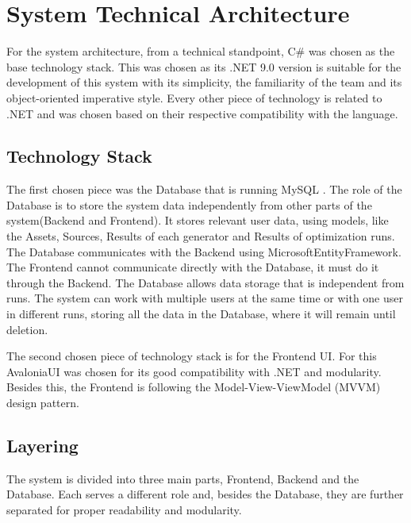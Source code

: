 \section{System Technical Architecture}

\hspace*{1cm}For the system architecture, from a technical standpoint, C\# \cite{csharp} was chosen as the base technology stack. This was chosen as its .NET 9.0 version is suitable for the development of this system with its simplicity, the familiarity of the team and its object-oriented imperative style. Every other piece of technology is related to .NET and was chosen based on their respective compatibility with the language.

\subsection*{Technology Stack}

\hspace*{1cm}The first chosen piece was the Database that is running MySQL \cite{dubois2013mysql}. The role of the Database is to store the system data independently from other parts of the system(Backend and Frontend). It stores relevant user data, using models, like the Assets, Sources, Results of each generator and Results of optimization runs. The Database communicates with the Backend using MicrosoftEntityFramework. The Frontend cannot communicate directly with the Database, it must do it through the Backend. The Database allows data storage that is independent from runs. The system can work with multiple users at the same time or with one user in different runs, storing all the data in the Database, where it will remain until deletion.
 
\hspace*{1cm}The second chosen piece of technology stack is for the Frontend UI. For this AvaloniaUI was chosen for its good compatibility with .NET and modularity. Besides this, the Frontend is following the Model-View-ViewModel (MVVM) design pattern.

\subsection*{Layering}

\hspace*{1cm}The system is divided into three main parts, Frontend, Backend and the Database. Each serves a different role and, besides the Database, they are further separated for proper readability and modularity.

